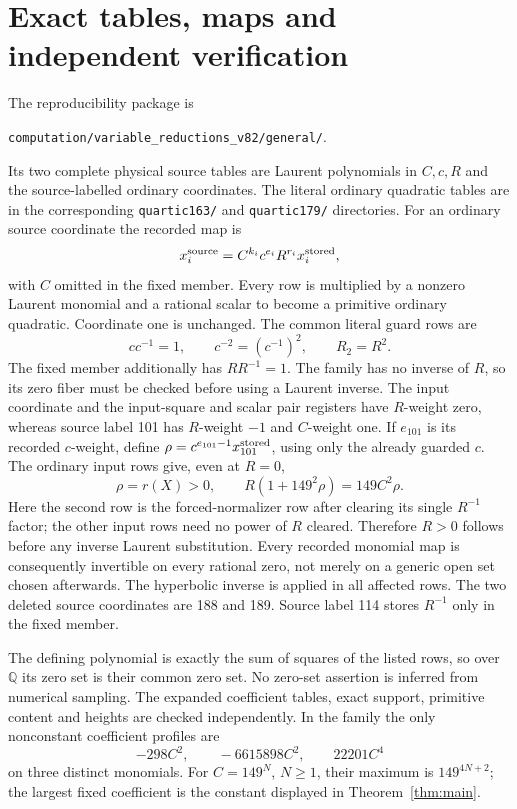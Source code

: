 \documentclass[11pt]{article}
\theoremstyle{remark}\newtheorem{remark}[theorem]{Remark}
\newcommand{\Q}{\mathbb Q}\newcommand{\Z}{\mathbb Z}
\begin{document}
\section{Exact tables, maps and independent verification}
The reproducibility package is
\begin{center}\small
\nolinkurl{computation/variable_reductions_v82/general/}.
\end{center}
Its two complete physical source tables are Laurent polynomials
in $C,c,R$ and the source-labelled ordinary coordinates. The
literal ordinary quadratic tables are in the corresponding
\texttt{quartic163/} and \texttt{quartic179/} directories.
For an ordinary source coordinate the recorded map is
\[
       x_i^{\rm source}=C^{k_i}c^{e_i}R^{r_i}x_i^{\rm stored},
\]
with $C$ omitted in the fixed member. Every row is multiplied by
a nonzero Laurent monomial and a rational scalar to become a
primitive ordinary quadratic. Coordinate one is unchanged.
The common literal guard rows are
\[
 c c^{-1}=1,\qquad c^{-2}=(c^{-1})^2,
 \qquad R_2=R^2.
\]
The fixed member additionally has $R R^{-1}=1$. The family
has no inverse of $R$, so its zero fiber must be checked before
using a Laurent inverse. The input coordinate and the input-square
and scalar pair registers have $R$-weight zero, whereas source
label 101 has $R$-weight $-1$ and $C$-weight one. If $e_{101}$
is its recorded $c$-weight, define
$\rho=c^{e_{101}-1}x_{101}^{\rm stored}$, using only the
already guarded $c$. The ordinary input rows give, even at $R=0$,
\[
 \rho=r(X)>0,\qquad R(1+149^2\rho)=149C^2\rho.
\]
Here the second row is the forced-normalizer row after clearing
its single $R^{-1}$ factor; the other input rows need no power
of $R$ cleared. Therefore $R>0$ follows before any inverse
Laurent substitution. Every recorded monomial map is consequently
invertible on every rational zero, not merely on a generic open
set chosen afterwards.
The hyperbolic inverse is applied in all affected rows.
The two deleted source coordinates are 188 and 189. Source
label 114 stores $R^{-1}$ only in the fixed member.

The defining polynomial is exactly the sum of squares of the
listed rows, so over $\Q$ its zero set is their common zero set.
No zero-set assertion is inferred from numerical sampling.
The expanded coefficient tables, exact support, primitive content
and heights are checked independently. In the family the only
nonconstant coefficient profiles are
\[
                    -298C^2,\qquad-6615898C^2,\qquad22201C^4
\]
on three distinct monomials. For $C=149^N$, $N\ge1$, their
maximum is $149^{4N+2}$; the largest fixed coefficient is the
constant displayed in Theorem~\ref{thm:main}.
\end{document}
